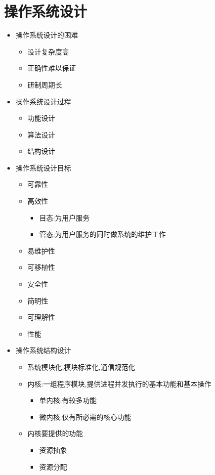 \documentclass[a4paper,10pt,notitlepage]{article}
\begin{document}
\section{操作系统设计}
\begin{itemize}
	\item 操作系统设计的困难
	\begin{itemize}
		\item 设计复杂度高
		\item 正确性难以保证
		\item 研制周期长
	\end{itemize}
	\item 操作系统设计过程
	\begin{itemize}
		\item 功能设计
		\item 算法设计
		\item 结构设计
	\end{itemize}
	\item 操作系统设计目标
	\begin{itemize}
		\item 可靠性
		\item 高效性
		\begin{itemize}
			\item 目态:为用户服务
			\item 管态:为用户服务的同时做系统的维护工作
		\end{itemize}
		\item 易维护性
		\item 可移植性
		\item 安全性
		\item 简明性
		\item 可理解性
		\item 性能
	\end{itemize}
	\item 操作系统结构设计
	\begin{itemize}
		\item 系统模块化,模块标准化,通信规范化
		\item 内核:一组程序模块,提供进程并发执行的基本功能和基本操作
		\begin{itemize}
			\item 单内核:有较多功能
			\item 微内核:仅有所必需的核心功能
		\end{itemize}
		\item 内核要提供的功能
		\begin{itemize}
			\item 资源抽象
			\item 资源分配

\end{itemize}
\end{itemize}
\end{itemize}
\end{document}
